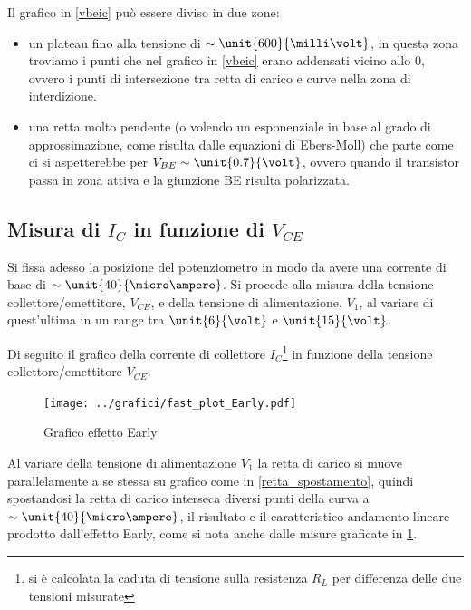 \documentclass[10pt,a4paper]{article}
\begin{document}
Il grafico in \figurename{\ref{vbeic}} può essere diviso in due zone:
\begin{itemize}
	\item un plateau fino alla tensione di $\sim \unit{600}{\milli\volt}$, in questa zona troviamo i punti che nel grafico in \figurename{\ref{vbeic}} erano addensati vicino allo $0$, ovvero i punti di intersezione tra retta di carico e curve nella zona di interdizione.
	\item una retta molto pendente (o volendo un esponenziale in base al grado di approssimazione, come risulta dalle equazioni di Ebers-Moll) che parte come ci si aspetterebbe per $V_{BE} \sim \unit{0.7}{\volt}$, ovvero quando il transistor passa in zona attiva e la giunzione BE risulta polarizzata.
\end{itemize}

\subsection{Misura di $I_C$ in funzione di $V_{CE}$}
Si fissa adesso la posizione del potenziometro in modo da avere una corrente di base di $\sim \unit{40}{\micro\ampere}$. Si procede alla misura della tensione collettore/emettitore, $V_{CE}$, e della tensione di alimentazione, $V_1$, al variare di quest'ultima in un range tra $\unit{6}{\volt}$ e $\unit{15}{\volt}$.

Di seguito il grafico della corrente di collettore $I_C$\footnote{si è calcolata la caduta di tensione sulla resistenza $R_L$ per differenza delle due tensioni misurate} in funzione della tensione collettore/emettitore $V_{CE}$.

\begin{figure}[h!]
	\centering
	\begin{minipage}[h!]{0.3\textwidth}
		\centering
		\resizebox{\textwidth}{!}{
			}
	\end{minipage}
	\begin{minipage}[d]{0.69\textwidth}
		\centering
		\texttt{[image: ../grafici/fast\_plot\_Early.pdf]}
		\caption{Grafico effetto Early}
		\label{early}
	\end{minipage}
\end{figure}

Al variare della tensione di alimentazione $V_1$ la retta di carico si muove parallelamente a se stessa su grafico come in \figurename{\ref{retta_spostamento}}, quindi spostandosi la retta di carico interseca diversi punti della curva a  $\sim \unit{40}{\micro\ampere}$, il risultato e il caratteristico andamento lineare prodotto dall'effetto Early, come si nota anche dalle misure graficate in \figurename{\ref{early}}.
\end{document}
